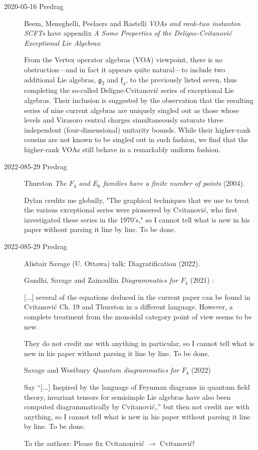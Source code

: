 \begin{description}
\item[2020-05-16 Predrag]
Beem, Meneghelli, Peelaers and Rastelli
{\em {VOAs} and rank-two instanton {SCFTs}}
have appendix {\em A Some Properties of the Deligne-Cvitanovi\'c
Exceptional Lie Algebras}:

From the Vertex operator algebras (VOA) viewpoint, there is no
obstruction---and in fact it appears quite natural---to include two
additional Lie algebras, $\mathfrak{g}_2$ and $\mathfrak{f}_4$, to the
previously listed seven, thus completing the so-called
Deligne-Cvitanovi\'c series of exceptional Lie algebras.
Their inclusion is suggested by the observation that the resulting series
of nine current algebras are uniquely singled out as those whose levels
and Virasoro central charges simultaneously saturate three independent
(four-dimensional) unitarity bounds. While their higher-rank cousins are
not known to be singled out in such fashion, we find that the higher-rank
VOAs still behave in a remarkably uniform fashion.

\item[2022-085-29 Predrag]
Thurston
{\em The {$F_4$} and {$E_6$} families have a finite number of points} (2004).

Dylan credits me globally,
"The graphical techniques that we use to treat the various exceptional
series were pioneered by Cvitanovi{\'c}, who first investigated these
series in the 1970's," so I cannot tell what is new in his paper
without parsing it line by line. To be done.

\item[2022-085-29 Predrag]
Alistair Savage (U. Ottawa) talk:
{Diagratification}  (2022).

Gandhi, Savage and Zainoullin
{\em Diagrammatics for {$F_4$}} (2021)
:

[...] several of the equations deduced in the current paper can be found
in Cvitanovi{\'c} Ch. 19 and Thurston in a
different language. However, a complete treatment from the monoidal
category point of view seems to be
new.

They do not credit me with anything in particular,  so I cannot tell what
is new in his paper without parsing it line by line. To be done.

Savage and Westbury
{\em Quantum diagrammatics for {$F_4$}}  (2022)

Say ``[...] Inspired by the language of Feynman diagrams in quantum field
theory, invariant tensors for semisimple Lie algebras have also been
computed diagrammatically by Cvitanovi{\'c},.'' but then not
credit me with anything,  so I cannot tell what is new in his paper
without parsing it line by line. To be done.

To the authors: Please fix Cvitanonivi{\'c} $\to$ Cvitanovi{\'c}!


\end{description}
\renewcommand{\ssp}{a}


\printbibliography[heading=subbibintoc,title={References}]
